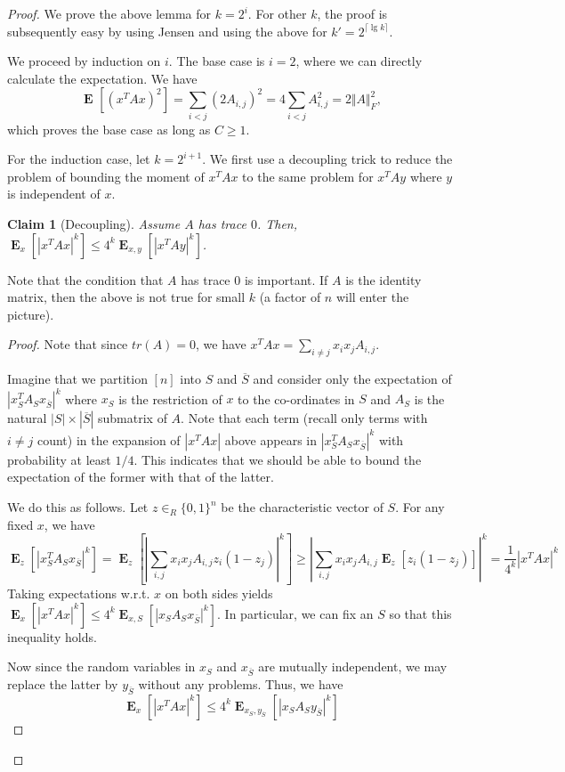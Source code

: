 \documentclass[11pt,a4paper]{article}
\newtheorem{claim}[theorem]{Claim}
\newcommand{\avg}[2]{\mathop{\textbf{E}}_{#1}[#2]}
\newcommand{\mynorm}[1]{\Vert #1 \Vert}
\begin{document}
\begin{proof}
We prove the above lemma for $k= 2^i$. For other $k$, the proof is subsequently easy by using Jensen and using the above for $k' = 2^{\lceil \lg k\rceil}$.

We proceed by induction on $i$. The base case is $i=2$, where we can directly calculate the expectation. We have
\[
\avg{}{(x^TAx)^2} = \sum_{i < j}  (2 A_{i,j})^2 = 4 \sum_{i < j} A_{i,j}^2 = 2 \mynorm{A}_F^2,
\]
which proves the base case as long as $C \geq 1$.

For the induction case, let $k = 2^{i+1}$. We first use a decoupling trick to reduce the problem of bounding the moment of $x^TAx$ to the same problem for $x^TAy$ where $y$ is independent of $x$. 

\begin{claim}[Decoupling]
\label{clm:decouple}
Assume $A$ has trace $0$. Then, $\avg{x}{|x^TAx|^k}\leq 4^k\avg{x,y}{|x^TAy|^k}$.
\end{claim}

Note that the condition that $A$ has trace $0$ is important. If $A$ is the identity matrix, then the above is not true for small $k$ (a factor of $n$ will enter the picture).

\begin{proof}
Note that since $tr(A)= 0$, we have $x^TAx = \sum_{i\neq j}x_ix_j A_{i,j}$.

Imagine that we partition $[n]$ into $S$ and $\overline{S}$ and consider only the expectation of $|x_S^T A_S x_{\overline{S}}|^k$ where $x_S$ is the restriction of $x$ to the co-ordinates in $S$ and $A_S$ is the natural $|S|\times |\overline{S}|$ submatrix of $A$. Note that each term (recall only terms with $i\neq j$ count) in the expansion of $|x^TAx|$ above appears in $|x_S^T A_S x_{\overline{S}}|^k$ with probability at least $1/4$. This indicates that we should be able to bound the expectation of the former with that of the latter. 

We do this as follows. Let $z\in_R \{0,1\}^n$ be the characteristic vector of $S$. For any fixed $x$, we have
\[
\avg{z}{|x_S^T A_S x_{\overline{S}}|^k} = \avg{z}{|\sum_{i, j} x_i x_j A_{i,j}z_i (1-z_j)|^k} \geq |\sum_{i, j} x_i x_j A_{i,j} \avg{z}{z_i (1-z_j)}|^k = \frac{1}{4^k}|x^TAx|^k
\]
Taking expectations w.r.t. $x$ on both sides yields $\avg{x}{|x^TAx|^k} \leq 4^k\avg{x,S}{|x_SA_Sx_{\overline{S}}|^k}$. In particular, we can fix an $S$ so that this inequality holds. 

Now since the random variables in $x_S$ and $x_{\overline{S}}$ are mutually independent, we may replace the latter by $y_{\overline{S}}$ without any problems. Thus, we have
\[
\avg{x}{|x^TAx|^k} \leq 4^k\avg{x_S,y_{\overline{S}}}{|x_SA_Sy_{\overline{S}}|^k} 
\]


\end{proof}
\end{proof}
\end{document}

